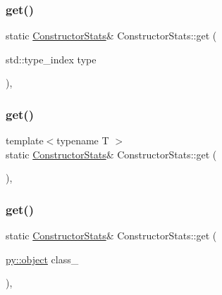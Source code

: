 \mbox{\label{class_constructor_stats_a6766d3e57ee38f5e64151c83e0e6c0d3}} 
\subsubsection{\texorpdfstring{get()}{get()}\hspace{0.1cm}{\footnotesize\ttfamily [1/3]}}
{\footnotesize\ttfamily static \mbox{\hyperlink{class_constructor_stats}{Constructor\+Stats}}\& Constructor\+Stats\+::get (\begin{DoxyParamCaption}\item[{std\+::type\+\_\+index}]{type }\end{DoxyParamCaption})\hspace{0.3cm}{\ttfamily [inline]}, {\ttfamily [static]}}

\mbox{\label{class_constructor_stats_a0f17a4707348b90553c2e5920fc6f9a4}} 
\subsubsection{\texorpdfstring{get()}{get()}\hspace{0.1cm}{\footnotesize\ttfamily [2/3]}}
{\footnotesize\ttfamily template$<$typename T $>$ \\
static \mbox{\hyperlink{class_constructor_stats}{Constructor\+Stats}}\& Constructor\+Stats\+::get (\begin{DoxyParamCaption}{ }\end{DoxyParamCaption})\hspace{0.3cm}{\ttfamily [inline]}, {\ttfamily [static]}}

\mbox{\label{class_constructor_stats_aee1d74bbf24b9e0989cb53f69ef48da7}} 
\subsubsection{\texorpdfstring{get()}{get()}\hspace{0.1cm}{\footnotesize\ttfamily [3/3]}}
{\footnotesize\ttfamily static \mbox{\hyperlink{class_constructor_stats}{Constructor\+Stats}}\& Constructor\+Stats\+::get (\begin{DoxyParamCaption}\item[{\mbox{\hyperlink{_s_d_l__opengles2__gl2ext_8h_ab49790263c78300fbf05719e38246198}{py\+::object}}}]{class\+\_\+ }\end{DoxyParamCaption})\hspace{0.3cm}{\ttfamily [inline]}, {\ttfamily [static]}}

